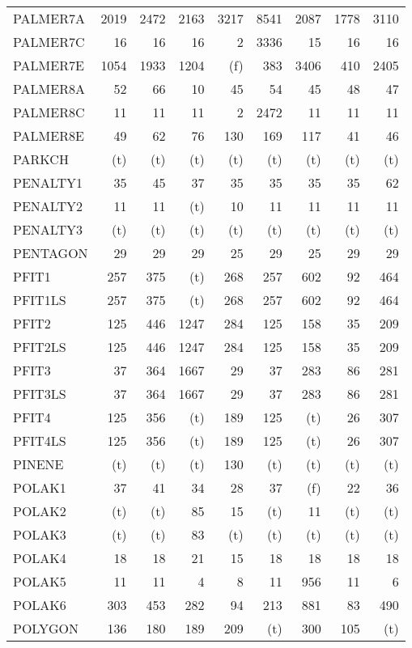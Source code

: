 \documentclass[11pt,twoside]{article}
\begin{document}
{\begin{longtable}[c]{|l|r|r|r|r|r|r|r|r|}
 PALMER7A & 2019 & 2472 & 2163 & 3217 & 8541 & 2087 & 1778 & 3110 \\
 PALMER7C & 16 & 16 & 16 & 2 & 3336 & 15 & 16 & 16 \\
 PALMER7E & 1054 & 1933 & 1204 & (f) & 383 & 3406 & 410 & 2405 \\
 PALMER8A & 52 & 66 & 10 & 45 & 54 & 45 & 48 & 47 \\
 PALMER8C & 11 & 11 & 11 & 2 & 2472 & 11 & 11 & 11 \\
 PALMER8E & 49 & 62 & 76 & 130 & 169 & 117 & 41 & 46 \\
 PARKCH & (t) & (t) & (t) & (t) & (t) & (t) & (t) & (t) \\
 PENALTY1 & 35 & 45 & 37 & 35 & 35 & 35 & 35 & 62 \\
 PENALTY2 & 11 & 11 & (t) & 10 & 11 & 11 & 11 & 11 \\
 PENALTY3 & (t) & (t) & (t) & (t) & (t) & (t) & (t) & (t) \\
 PENTAGON & 29 & 29 & 29 & 25 & 29 & 25 & 29 & 29 \\
 PFIT1 & 257 & 375 & (t) & 268 & 257 & 602 & 92 & 464 \\
 PFIT1LS & 257 & 375 & (t) & 268 & 257 & 602 & 92 & 464 \\
 PFIT2 & 125 & 446 & 1247 & 284 & 125 & 158 & 35 & 209 \\
 PFIT2LS & 125 & 446 & 1247 & 284 & 125 & 158 & 35 & 209 \\
 PFIT3 & 37 & 364 & 1667 & 29 & 37 & 283 & 86 & 281 \\
 PFIT3LS & 37 & 364 & 1667 & 29 & 37 & 283 & 86 & 281 \\
 PFIT4 & 125 & 356 & (t) & 189 & 125 & (t) & 26 & 307 \\
 PFIT4LS & 125 & 356 & (t) & 189 & 125 & (t) & 26 & 307 \\
 PINENE & (t) & (t) & (t) & 130 & (t) & (t) & (t) & (t) \\
 POLAK1 & 37 & 41 & 34 & 28 & 37 & (f) & 22 & 36 \\
 POLAK2 & (t) & (t) & 85 & 15 & (t) & 11 & (t) & (t) \\
 POLAK3 & (t) & (t) & 83 & (t) & (t) & (t) & (t) & (t) \\
 POLAK4 & 18 & 18 & 21 & 15 & 18 & 18 & 18 & 18 \\
 POLAK5 & 11 & 11 & 4 & 8 & 11 & 956 & 11 & 6 \\
 POLAK6 & 303 & 453 & 282 & 94 & 213 & 881 & 83 & 490 \\
 POLYGON & 136 & 180 & 189 & 209 & (t) & 300 & 105 & (t) \\

\end{longtable}}
\end{document}
